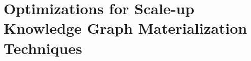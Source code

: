 
\chapter{Optimizations for Scale-up Knowledge Graph Materialization Techniques}
\label{chapter:construction}




